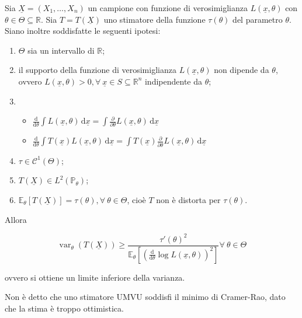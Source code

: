 \documentclass[hidelinks, 10pt]{report}
\DeclareMathOperator{\var}{var}
\begin{document}
\begin{thm}
Sia $ \underline{X} = (X_1, \dotsc, X_n) $ un campione con funzione di verosimiglianza $ L(\underline{x}, \theta) $ con $ \theta \in \Theta \subseteq \mathbb{R} $. Sia $ T = T(\underline{X}) $ uno stimatore della funzione $ \tau(\theta) $ del parametro $ \theta $. Siano inoltre soddisfatte le seguenti ipotesi:
\begin{enumerate}
\item $ \Theta $ sia un intervallo di $ \mathbb{R} $;
\item il supporto della funzione di verosimiglianza $ L(\underline{x}, \theta) $ non dipende da $ \theta $, ovvero $ L(\underline{x}, \theta) > 0, \forall\ \underline{x} \in S \subseteq \mathbb{R}^n $ indipendente da $ \theta $;
\item \noindent
\begin{itemize}
\item $ \frac{\mathrm{d}}{\mathrm{d} \theta} \int L(\underline{x}, \theta) \, \mathrm{d}\underline{x} = \int \frac{\partial}{\partial \theta} L(\underline{x}, \theta) \, \mathrm{d}\underline{x} $
\item $ \frac{\mathrm{d}}{\mathrm{d} \theta} \int T(\underline{x}) L(\underline{x}, \theta) \, \mathrm{d}\underline{x} = \int T(\underline{x}) \frac{\partial}{\partial \theta} L(\underline{x}, \theta) \, \mathrm{d}\underline{x} $
\end{itemize}
\item $ \tau \in \mathcal{C}^{1} (\Theta) $;
\item $ T(\underline{X}) \in L^2 (\mathbb{P}_{\theta}) $;
\item $ \mathbb{E}_{\theta} [T(\underline{X})] = \tau(\theta), \forall\ \theta \in \Theta $, cio\`e $ T $ non \`e distorta per $ \tau(\theta) $.
\end{enumerate}
Allora

\begin{equation}	\label{eq:e1}
\var_{\theta} (T(\underline{X})) \ge \frac{\tau'(\theta)^2}{\mathbb{E}_{\theta} \left[ \left( \frac{\mathrm{d}}{\mathrm{d} \theta} \log L(\underline{x}, \theta) \right)^2 \right] } \forall\ \theta \in \Theta
\end{equation}

ovvero si ottiene un limite inferiore della varianza.
\end{thm}

\begin{oss}
Non \`e detto che uno stimatore UMVU  soddisfi il minimo di Cramer-Rao, dato che la stima \`e troppo ottimistica.
\end{oss}
\end{document}
